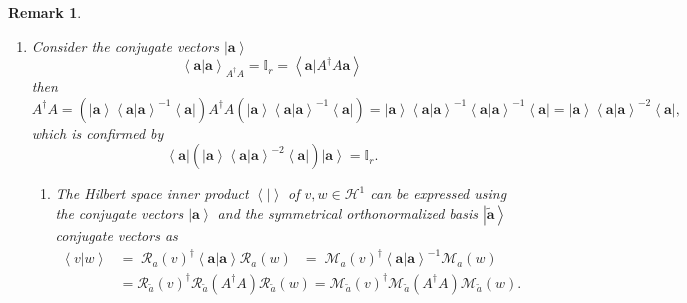 \documentclass[aps,preprint]{revtex4}%
\newtheorem{remark}[theorem]{Remark}
\begin{document}
\begin{remark}
\begin{enumerate}
\item Consider the conjugate vectors $\left\vert \mathbf{a}\right\rangle $
\begin{equation}
\left\langle \left.  \mathbf{a}\right\vert \mathbf{a}\right\rangle
_{A^{\dagger}A}=\mathbb{I}_{r}=\left\langle \left.  \mathbf{a}\right\vert
A^{\dagger}A\mathbf{a}\right\rangle
\end{equation}
then%
\begin{equation}
A^{\dagger}A=\left(  \left\vert \mathbf{a}\right\rangle \left\langle \left.
\mathbf{a}\right\vert \mathbf{a}\right\rangle ^{-1}\left\langle \mathbf{a}%
\right\vert \right)  A^{\dagger}A\left(  \left\vert \mathbf{a}\right\rangle
\left\langle \left.  \mathbf{a}\right\vert \mathbf{a}\right\rangle
^{-1}\left\langle \mathbf{a}\right\vert \right)  =\left\vert \mathbf{a}%
\right\rangle \left\langle \left.  \mathbf{a}\right\vert \mathbf{a}%
\right\rangle ^{-1}\left\langle \left.  \mathbf{a}\right\vert \mathbf{a}%
\right\rangle ^{-1}\left\langle \mathbf{a}\right\vert =\left\vert
\mathbf{a}\right\rangle \left\langle \left.  \mathbf{a}\right\vert
\mathbf{a}\right\rangle ^{-2}\left\langle \mathbf{a}\right\vert ,
\end{equation}
which is confirmed by%
\begin{equation}
\left\langle \mathbf{a}\right\vert \left(  \left\vert \mathbf{a}\right\rangle
\left\langle \left.  \mathbf{a}\right\vert \mathbf{a}\right\rangle
^{-2}\left\langle \mathbf{a}\right\vert \right)  \left\vert \mathbf{a}%
\right\rangle =\mathbb{I}_{r}.
\end{equation}


\begin{enumerate}
\item The Hilbert space inner product $\left\langle \left.  {}\right\vert
\right\rangle $ of $v,w\in\mathcal{H}^{1}$ can be expressed using the
conjugate vectors $\left\vert \mathbf{a}\right\rangle $ and the symmetrical
orthonormalized basis $\left\vert \widetilde{\mathbf{a}}\right\rangle $
conjugate vectors as%
\begin{align}
\left\langle \left.  v\right\vert w\right\rangle  &  =\;\mathcal{R}_{a}\left(
v\right)  ^{\dagger}\left\langle \left.  \mathbf{a}\right\vert \mathbf{a}%
\right\rangle \mathcal{R}_{a}\left(  w\right)  \;\;\,=\;\mathcal{M}_{a}\left(
v\right)  ^{\dagger}\left\langle \left.  \mathbf{a}\right\vert \mathbf{a}%
\right\rangle ^{-1}\mathcal{M}_{a}\left(  w\right) \\
&  =\mathcal{R}_{\widetilde{a}}\left(  v\right)  ^{\dagger}\mathcal{R}%
_{\widetilde{a}}\left(  A^{\dagger}A\right)  \mathcal{R}_{\widetilde{a}%
}\left(  w\right)  =\mathcal{M}_{\widetilde{a}}\left(  v\right)  ^{\dagger
}\mathcal{M}_{\widetilde{a}}\left(  A^{\dagger}A\right)  \mathcal{M}%
_{\widetilde{a}}\left(  w\right)  .
\end{align}



\end{enumerate}
\end{enumerate}
\end{remark}
\end{document}
